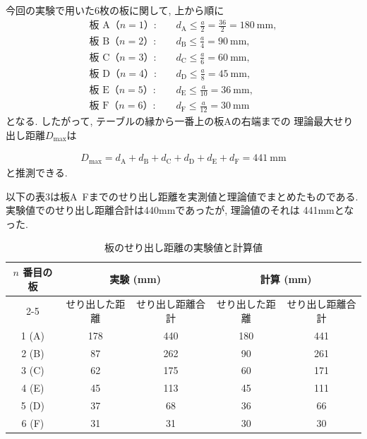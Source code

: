 \documentclass{jlreq}
\begin{document}
今回の実験で用いた6枚の板に関して, 上から順に
\begin{align}
    \text{板 A（$n=1$）}:&\quad d_{\mathrm{A}} \leq \frac{a}{2}
   = \frac{36}{2} = 180\ \mathrm{mm},\\
\text{板 B（$n=2$）}:&\quad d_{\mathrm{B}} \leq \frac{a}{4}
   = 90\ \mathrm{mm},\\
\text{板 C（$n=3$）}:&\quad d_{\mathrm{C}} \leq \frac{a}{6}
   = 60\ \mathrm{mm},\\
\text{板 D（$n=4$）}:&\quad d_{\mathrm{D}} \leq \frac{a}{8}
   = 45\ \mathrm{mm},\\
\text{板 E（$n=5$）}:&\quad d_{\mathrm{E}} \leq \frac{a}{10}
   = 36\ \mathrm{mm},\\
\text{板 F（$n=6$）}:&\quad d_{\mathrm{F}} \leq \frac{a}{12}
   = 30\ \mathrm{mm}
\end{align}
となる. したがって, テーブルの縁から一番上の板Aの右端までの
理論最大せり出し距離$D_{\max}$は

\begin{align}
    D_{\max} = d_{\mathrm{A}}+d_{\mathrm{B}}+d_{\mathrm{C}}
          +d_{\mathrm{D}}+d_{\mathrm{E}}+d_{\mathrm{F}}
          = 441\ \mathrm{mm}
\end{align}
と推測できる. \par

以下の表3は板A~Fまでのせり出し距離を実測値と理論値でまとめたものである.
実験値でのせり出し距離合計は440mmであったが, 理論値のそれは
441mmとなった. 


\begin{table}[htbp]
  \centering
  \caption{板のせり出し距離の実験値と計算値}
  \begin{tabular}{|c|c|c|c|c|}
    \hline
    \multirow{2}{*}{$n$ 番目の板} &
      \multicolumn{2}{c|}{実験 (mm)} &
      \multicolumn{2}{c|}{計算 (mm)} \\ \cline{2-5}
    & せり出した距離 & せり出し距離合計 &
      せり出した距離 & せり出し距離合計 \\
    \hline
    1 (A) & 178 & 440 & 180 & 441 \\
    \hline
    2 (B) &  87 & 262 &  90 & 261 \\
    \hline
    3 (C) &  62 & 175 &  60 & 171 \\
    \hline
    4 (E) &  45 & 113 &  45 & 111 \\
    \hline
    5 (D) &  37 &  68 &  36 &  66 \\
    \hline
    6 (F) &  31 &  31 &  30 &  30 \\
    \hline
  \end{tabular}
  \label{tab:overhang_result}
\end{table}
   
\end{document}
